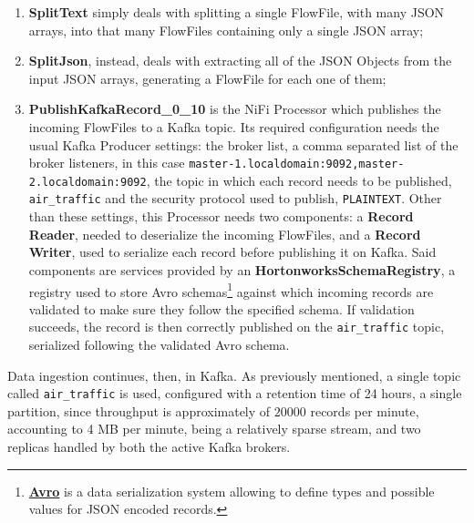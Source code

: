 \begin{enumerate}
\item \textbf{SplitText} simply deals with splitting a single FlowFile, with many JSON arrays, into that many FlowFiles containing only a single JSON array;
\item \textbf{SplitJson}, instead, deals with extracting all of the JSON Objects from the input JSON arrays, generating a FlowFile for each one of them;
\item \textbf{PublishKafkaRecord\_0\_10} is the NiFi Processor which publishes the incoming FlowFiles to a Kafka topic. Its required configuration needs the usual Kafka Producer settings: the broker list, a comma separated list of the broker listeners, in this case \texttt{master-1.localdomain:9092,master-2.localdomain:9092}, the topic in which each record needs to be published, \texttt{air\_traffic} and the security protocol used to publish, \texttt{PLAINTEXT}. Other than these settings, this Processor needs two components: a \textbf{Record Reader}, needed to deserialize the incoming FlowFiles, and a \textbf{Record Writer}, used to serialize each record before publishing it on Kafka. Said components are services provided by an \textbf{HortonworksSchemaRegistry}, a registry used to store Avro schemas\footnote{\textbf{\href{https://avro.apache.org/}{Avro}} is a data serialization system allowing to define types and possible values for JSON encoded records.} against which incoming records are validated to make sure they follow the specified schema. If validation succeeds, the record is then correctly published on the \texttt{air\_traffic} topic, serialized following the validated Avro schema.
\end{enumerate}

Data ingestion continues, then, in Kafka. As previously mentioned, a single topic called \texttt{air\_traffic} is used, configured with a retention time of 24 hours, a single partition, since throughput is approximately of $20000$ records per minute, accounting to 4 MB per minute, being a relatively sparse stream, and two replicas handled by both the active Kafka brokers.